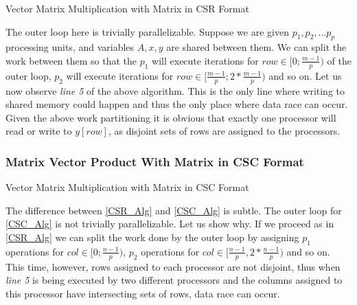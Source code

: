 \begin{algorithm}[H]
 \centering
 \caption{Vector Matrix Multiplication with Matrix in CSR Format}\label{CSR_Alg}
 \begin{algorithmic}[1]
				\EndFor
			\EndFor
		\EndProcedure
 \end{algorithmic}
\end{algorithm}

The outer loop here is trivially parallelizable. Suppose we are given $p_1, p_2, \dots p_p$ processing units, and variables $A, x, y$ are shared between them. We can split the work between them so that the $p_1$ will execute iterations for $row \in [0;\frac{m-1}{p})$ of the outer loop, $p_2$ will execute iterations for $row \in [\frac{m-1}{p};2*\frac{m-1}{p})$ and so on. Let us now observe \textit{line 5} of the above algorithm. This is the only line where writing to shared memory could happen and thus the only place where data race can occur. Given the above work partitioning it is obvious that exactly one processor will read or write to $y[row]$, as disjoint sets of rows are assigned to the processors.
\subsubsection{Matrix Vector Product With Matrix in CSC Format}

\begin{algorithm}[H]
 \centering
 \caption{Vector Matrix Multiplication with Matrix in CSC Format}\label{CSC_Alg}
 \begin{algorithmic}[1]
				\EndFor
			\EndFor
		\EndProcedure
 \end{algorithmic}
\end{algorithm}

The difference between \cref{CSR_Alg} and \cref{CSC_Alg} is subtle. The outer loop for \cref{CSC_Alg} is not trivially parallelizable. Let us show why. If we proceed as in \cref{CSR_Alg} we can split the work done by the outer loop by assigning $p_1$ operations for $col \in [0;\frac{n-1}{p})$, $p_2$ operations for $col \in [\frac{n-1}{p}, 2*\frac{n-1}{p})$ and so on. This time, however, rows assigned to each processor are not disjoint, thus when \textit{line 5} is being executed by two different processors and the columns assigned to this processor have intersecting sets of rows, data race can occur.

